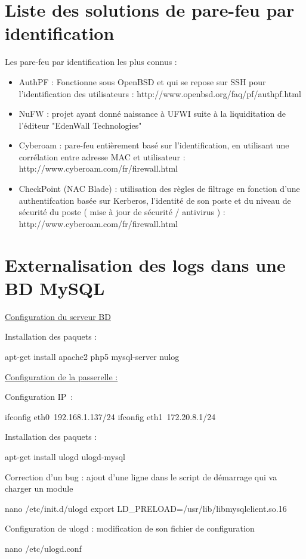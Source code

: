 \documentclass[12pt]{report}
\begin{document}
\begin{itemize}
\chapter{Liste des solutions de pare-feu par identification}
Les pare-feu par identification les plus connus : 
  \begin{itemize}
    \item AuthPF : Fonctionne sous OpenBSD et qui se repose sur SSH pour l'identification des utilisateurs : http://www.openbsd.org/faq/pf/authpf.html
    \item NuFW : projet ayant donné naissance à UFWI suite à la liquiditation de l'éditeur "EdenWall Technologies"
    \item Cyberoam : pare-feu entièrement basé sur l'identification, en utilisant une corrélation entre adresse MAC et utilisateur : http://www.cyberoam.com/fr/firewall.html
    \item CheckPoint (NAC Blade) : utilisation des règles de filtrage en fonction d'une authentifcation basée sur Kerberos, l'identité de son poste et du niveau de sécurité du poste ( mise à jour de sécurité / antivirus ) : http://www.cyberoam.com/fr/firewall.html
  \end{itemize}
\chapter{Externalisation des logs dans une BD MySQL}
\underline{Configuration du serveur BD}

Installation des paquets :

apt-get install apache2 php5 mysql-server nulog

\underline{Configuration de la passerelle :}

Configuration IP :

ifconfig eth0 192.168.1.137/24
ifconfig eth1 172.20.8.1/24

Installation des paquets :

apt-get install ulogd ulogd-mysql

Correction d'un bug : ajout d’une ligne dans le script de démarrage qui va charger un module

nano /etc/init.d/ulogd
export LD_PRELOAD=/usr/lib/libmysqlclient.so.16

Configuration de ulogd : modification de son fichier de configuration

nano /etc/ulogd.conf


\end{itemize}
\end{document}
